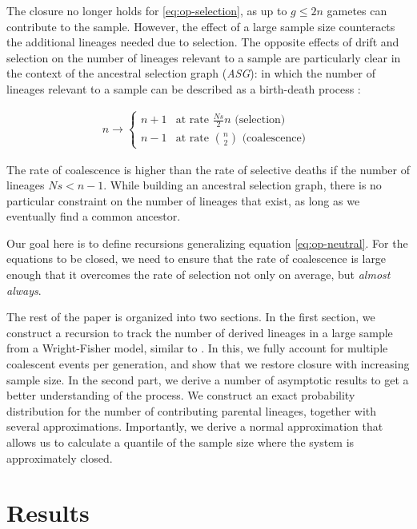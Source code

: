 \documentclass[review]{elsarticle}
\newcommand{\ra}{\rightarrow}
\begin{document}
The closure no longer holds for \eqref{eq:op-selection}, as up to $g \le 2n$ gametes can contribute
to the sample. However, the effect of a large sample size counteracts the additional lineages needed
due to selection. The opposite effects of drift and selection on the number of lineages relevant to
a sample are particularly clear in the context of the ancestral selection graph (\textit{ASG}): in
which the number of lineages relevant to a sample can be described as a birth-death process
\cite{KroneNeuhauser1997, Wakeley2009}:

\begin{align}
  \label{eq:asg-size}
  n \ra \begin{cases}
      n+1 & \text{at rate } \frac{Ns}{2} n  \text{ (selection) }\\
      n-1 & \text{at rate } \binom{n}{2} \text{ (coalescence) }
    \end{cases}
\end{align}

The rate of coalescence is higher than the rate of selective deaths if the number of lineages $Ns<
n-1$. While building an ancestral selection graph, there is no particular constraint on the number
of lineages that exist, as long as we eventually find a common ancestor.

Our goal here is to define recursions generalizing equation \eqref{eq:op-neutral}. For the equations
to be closed, we need to ensure that the rate of coalescence is large enough that it overcomes the
rate of selection not only on average, but \emph{almost always}.

The rest of the paper is organized into two sections. In the first section, we construct a recursion
to track the number of derived lineages in a large sample from a Wright-Fisher model, similar to
\cite{JouganousEtAl2017,KammEtAl2017}. In this, we fully account for multiple coalescent events per
generation, and show that we restore closure with increasing sample size. In the second part, we
derive a number of asymptotic results to get a better understanding of the process. We construct an
exact probability distribution for the number of contributing parental lineages, together with
several approximations. Importantly, we derive a normal approximation that allows us to calculate a
quantile of the sample size where the system is approximately closed.

\section{Results}
\label{sec:results}
\end{document}
